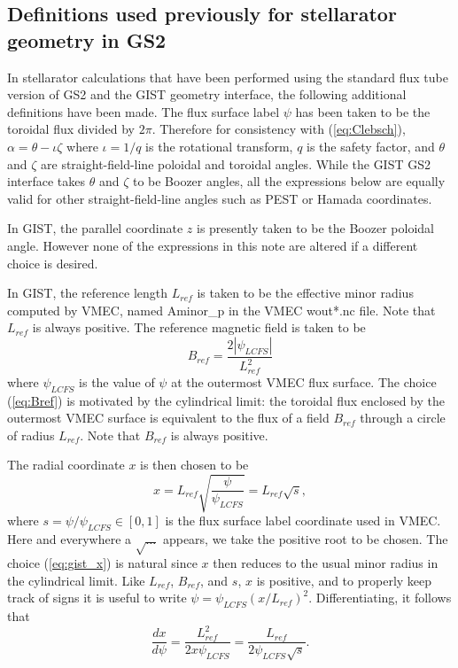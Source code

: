 \documentclass[11pt,letter]{article}
\begin{document}
\subsection{Definitions used previously for stellarator geometry in GS2}

In stellarator calculations that have been performed using the standard flux tube version of GS2
and the GIST geometry interface,
the following additional definitions have been made. 
The flux surface label $\psi$ has been taken to be the toroidal flux divided by $2\pi$.
Therefore for consistency with (\ref{eq:Clebsch}),
$\alpha = \theta - \iota \zeta$ where $\iota = 1/q$ is the rotational transform,
$q$ is the safety factor, and $\theta$ and $\zeta$ are straight-field-line poloidal and toroidal angles.
While the GIST GS2 interface takes $\theta$ and $\zeta$ to be Boozer
angles, all the expressions below are equally valid for other straight-field-line angles such as PEST or Hamada coordinates.

In GIST, the parallel coordinate $z$ is presently taken to be the Boozer poloidal angle. However none of the expressions in this note are altered if a different choice is desired.

In GIST, the reference length $L_{ref}$ is taken to be the effective minor radius computed by VMEC, named Aminor\_p in
the VMEC wout*.nc file.
Note that $L_{ref}$ is always positive.
The reference magnetic field is taken to be
\begin{equation}
B_{ref} = \frac{2 |\psi_{LCFS}|}{L_{ref}^2}
\label{eq:Bref}
\end{equation}
where $\psi_{LCFS}$ is the value of $\psi$ at the outermost VMEC flux surface. The choice (\ref{eq:Bref}) is
motivated by the cylindrical limit: the toroidal flux enclosed by the outermost VMEC surface is equivalent to the flux of a field $B_{ref}$ through a circle of radius $L_{ref}$.
Note that $B_{ref}$ is always positive.


The radial coordinate $x$ is then chosen to be
\begin{equation}
x = L_{ref} \sqrt{\frac{\psi}{\psi_{LCFS}}} = L_{ref} \sqrt{s},
\label{eq:gist_x}
\end{equation}
where $s =\psi / \psi_{LCFS} \in [0,1]$ is the flux surface label coordinate
used in VMEC. 
Here and everywhere a $\sqrt{\ldots}$ appears, we take the positive root to be chosen.
The choice (\ref{eq:gist_x}) is natural since 
$x$ then reduces to the usual minor radius in the cylindrical limit.
Like $L_{ref}$, $B_{ref}$, and $s$, $x$ is positive, and to properly keep track of signs it is useful to write $\psi = \psi_{LCFS} (x/L_{ref})^2$. Differentiating, 
it follows that
\begin{equation}
\frac{dx}{d\psi} = 
\frac{L_{ref}^2}{2 x \psi_{LCFS}} = \frac{L_{ref}}{2 \psi_{LCFS} \sqrt{s}} .
\label{eq:psi_x_conversion}
\end{equation}
\end{document}

